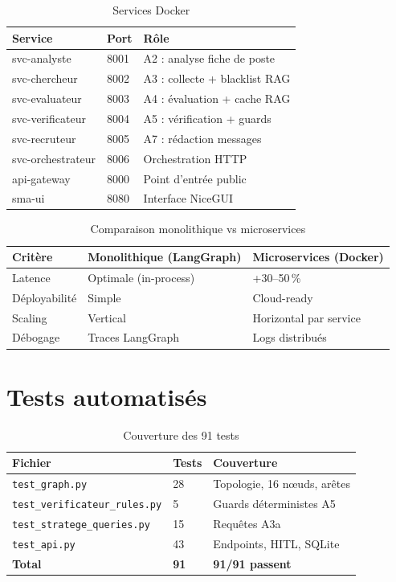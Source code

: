 \documentclass[12pt,a4paper]{report}
\begin{document}
\begin{table}[H]
\centering
\caption{Services Docker}
\label{tab:microservices}
\begin{tabularx}{\textwidth}{L{3.5cm}C{1.5cm}L{8cm}}
\toprule
\textbf{Service} & \textbf{Port} & \textbf{Rôle} \\
\midrule
svc-analyste   & 8001 & A2 : analyse fiche de poste \\
svc-chercheur  & 8002 & A3 : collecte + blacklist RAG \\
svc-evaluateur & 8003 & A4 : évaluation + cache RAG \\
svc-verificateur & 8004 & A5 : vérification + guards \\
svc-recruteur  & 8005 & A7 : rédaction messages \\
svc-orchestrateur & 8006 & Orchestration HTTP \\
api-gateway    & 8000 & Point d'entrée public \\
sma-ui         & 8080 & Interface NiceGUI \\
\bottomrule
\end{tabularx}
\end{table}

\begin{table}[H]
\centering
\caption{Comparaison monolithique vs microservices}
\label{tab:tradeoffs}
\begin{tabularx}{\textwidth}{L{3cm}L{5.5cm}L{5cm}}
\toprule
\textbf{Critère} & \textbf{Monolithique (LangGraph)} & \textbf{Microservices (Docker)} \\
\midrule
Latence & Optimale (in-process) & +30--50\,\% \\
Déployabilité & Simple & Cloud-ready \\
Scaling & Vertical & Horizontal par service \\
Débogage & Traces LangGraph & Logs distribués \\
\bottomrule
\end{tabularx}
\end{table}

\section{Tests automatisés}

\begin{table}[H]
\centering
\caption{Couverture des 91 tests}
\label{tab:tests}
\begin{tabularx}{\textwidth}{L{5.5cm}C{2cm}L{5.5cm}}
\toprule
\textbf{Fichier} & \textbf{Tests} & \textbf{Couverture} \\
\midrule
\texttt{test\_graph.py} & 28 & Topologie, 16 nœuds, arêtes \\
\texttt{test\_verificateur\_rules.py} & 5 & Guards déterministes A5 \\
\texttt{test\_stratege\_queries.py} & 15 & Requêtes A3a \\
\texttt{test\_api.py} & 43 & Endpoints, HITL, SQLite \\
\midrule
\textbf{Total} & \textbf{91} & \textbf{91/91 passent} \\
\bottomrule
\end{tabularx}
\end{table}
\end{document}
